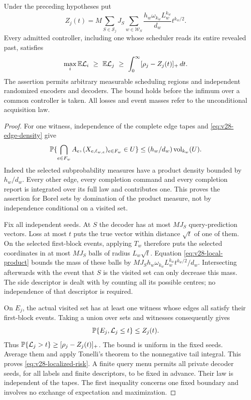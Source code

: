 \begin{theorem}\label{thm:v28-localized}
Under the preceding hypotheses put
\begin{equation}\label{eq:v28-witness-sum}
 Z_j(t)=M\sum_{S\in\mathscr S_j}J_S
              \sum_{w\in\mathscr W_S}
                   \frac{h_w\omega_{k_w}L_w^{k_w}}{d_w}
                                     t^{k_w/2}.
\end{equation}
Every admitted controller, including one whose scheduler reads its
entire revealed past, satisfies
\begin{equation}\label{eq:v28-localized-risk}
 \max_i\mathbb E\mathcal L_i\ \ge\ \mathbb E\mathcal L_j
       \ \ge\ \int_0^\infty[\rho_j-Z_j(t)]_+\,dt.
\end{equation}
The assertion permits arbitrary measurable scheduling regions and
independent randomized encoders and decoders. The bound holds before
the infimum over a common controller is taken. All losses and event
masses refer to the unconditional acquisition law.
\end{theorem}
\begin{proof}
For one witness, independence of the complete edge tapes and
\eqref{eq:v28-edge-density} give
\begin{equation}\label{eq:v28-local-product}
 \mathbb P\{\bigcap_{e\in F_w}A_e,
                   (X_{e,\ell_{w,e}})_{e\in F_w}\in U\}
          \le (h_w/d_w)\operatorname{vol}_{k_w}(U).
\end{equation}
Indeed the selected subprobability measures have a product density
bounded by $h_w/d_w$. Every other edge, every completion command and
every completion report is integrated over its full law and contributes
one. This proves the assertion for Borel sets by domination of the
product measure, not by independence conditional on a visited set.

Fix all independent seeds. At $S$ the decoder has at most $MJ_S$
query-prediction vectors. Loss at most $t$ puts the true vector within
distance $\sqrt t$ of one of them. On the selected first-block events,
applying $T_w$ therefore puts the selected coordinates in at most
$MJ_S$ balls of radius $L_w\sqrt t$. Equation
\eqref{eq:v28-local-product} bounds the mass of these balls by
$MJ_Sh_w\omega_{k_w}L_w^{k_w}t^{k_w/2}/d_w$. Intersecting afterwards
with the event that $S$ is the visited set can only decrease this mass.
The side descriptor is dealt with by counting all its possible centres;
no independence of that descriptor is required.

On $E_j$, the actual visited set has at least one witness whose edges
all satisfy their first-block events. Taking a union over sets and
witnesses consequently gives
\[
        \mathbb P\{E_j,\mathcal L_j\le t\}\le Z_j(t).
\]
Thus $\mathbb P\{\mathcal L_j>t\}\ge[\rho_j-Z_j(t)]_+$. The bound
is uniform in the fixed seeds. Average them and apply Tonelli's theorem
to the nonnegative tail integral. This proves
\eqref{eq:v28-localized-risk}. A finite query menu permits all private
decoder seeds, for all labels and finite descriptors, to be fixed in
advance. Their law is independent of the tapes. The first inequality
concerns one fixed boundary and involves no exchange of expectation
and maximization.
\end{proof}

